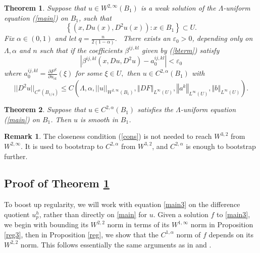 \documentclass[12pt,leqno]{amsart}%
\newtheorem{theorem}{Theorem}[section]
\theoremstyle{plain}
\numberwithin{equation}{section}
\theoremstyle{definition}
\newtheorem{remark}{Remark}[section]
\begin{document}
\begin{theorem}
\label{main_1} Suppose that $u\in W^{2,\infty}(B_{1})$ is a weak solution of
the $\Lambda$-uniform equation (\ref{main}) on $B_{1}$, such that
\[
\left\{  (x,Du(x),D^{2}u(x)):x\in B_{1}\right\}  \subset U.
\]
Fix $\alpha\in(0,1)$ and let $q=\frac{n}{2(1-\alpha)}.$ \ There
exists an $\varepsilon_{0}>0$, depending only on $\Lambda, \alpha$ and $n$
such that if the coefficients $\beta^{ij,kl}$ given by (\ref{bterm}) satisfy
\begin{equation}
\label{cons}\left|  \beta^{ij,kl}(x,Du,D^{2}u)-a_{0}^{ij,kl}\right|
<\varepsilon_{0}%
\end{equation}
where $a_{0}^{ij,kl}=\frac{\partial F^{jl}}{\partial u_{ik}}\left(
\xi\right)  $ for some $\xi\in U,$ then $u\in C^{2,\alpha}(B_{1})$ with
\[
||D^{2}u||_{C^{\alpha}(B_{1/4})}\leq C(\Lambda, \alpha,||u||_{W^{2,\infty
}(B_{1})}, \left\Vert DF \right\Vert _{L^{\infty}(U)},\left\Vert
a^{k}\right\Vert _{L^{\infty}(U)}, \left\Vert b \right\Vert _{L^{\infty}%
(U)}).
\]


\end{theorem}

\begin{theorem}
\label{main_2} Suppose that $u\in C^{2,\alpha}(B_{1})$ satisfies the $\Lambda
$-uniform equation (\ref{main}) on $B_{1}$. Then $u$ is smooth in $B_{1}$.
\end{theorem}

\begin{remark}
The closeness condition (\ref{cons}) is not needed to reach $W^{3,2}$ from
$W^{2,\infty}$. It is used to bootstrap to $C^{2,\alpha}$ from $W^{3,2}$, and
$C^{2,\alpha}$ is enough to bootstrap further.
\end{remark}


\subsection{Proof of Theorem \ref{main_1}}

To boost up regularity, we will work with equation \eqref{main3} on the
difference quotient $u^{h}_{p}$, rather than directly on \eqref{main} for $u$.
Given a solution $f$ to \eqref{main3}, we begin with bounding its $W^{2,2}$
norm in terms of its $W^{1,\infty}$ norm in Proposition \ref{reg3}, then in
Proposition \ref{reg}, we show that the $C^{1,\alpha}$ norm of $f$ depends on
its $W^{2,2}$ norm. This follows essentially the same arguments as in
\cite[Lemma 3.1]{CW} and \cite[Proposition 1.3]{BW1}.
\end{document}
